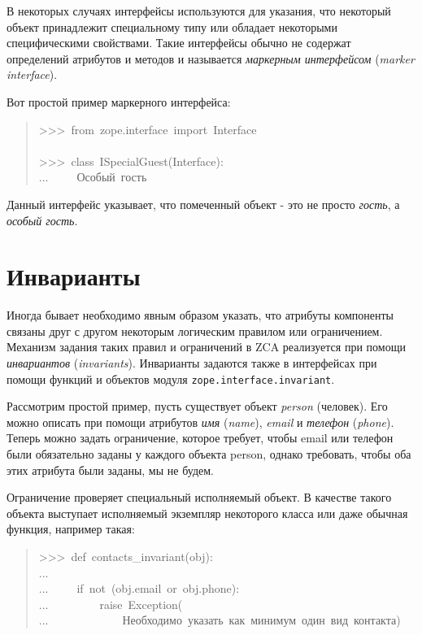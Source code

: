 \documentclass[a4paper,openany,twoside,final]{book}
\providecommand*{\DUroletitlereference}[1]{\textsl{#1}}
\begin{document}
В некоторых случаях интерфейсы используются для указания, что
некоторый объект принадлежит специальному типу или обладает некоторыми
специфическими свойствами.  Такие интерфейсы обычно не содержат
определений атрибутов и методов и называется \DUroletitlereference{маркерным интерфейсом}
(\DUroletitlereference{marker interface}).

Вот простой пример маркерного интерфейса:

\begin{quote}{\ttfamily \raggedright \noindent
>{}>{}>~from~zope.interface~import~Interface\\
~\\
>{}>{}>~class~ISpecialGuest(Interface):\\
...~~~~~\textquotedbl{}\textquotedbl{}\textquotedbl{}Особый~гость\textquotedbl{}\textquotedbl{}\textquotedbl{}
}
\end{quote}

Данный интерфейс указывает, что помеченный объект - это не просто
\DUroletitlereference{гость}, а \DUroletitlereference{особый гость}.


\section{Инварианты%
  \label{id32}%
}

Иногда бывает необходимо явным образом указать, что атрибуты
компоненты связаны друг с другом некоторым логическим правилом или
ограничением.  Механизм задания таких правил и ограничений в ZCA
реализуется при помощи \DUroletitlereference{инвариантов} (\DUroletitlereference{invariants}).  Инварианты
задаются также в интерфейсах при помощи функций и объектов модуля \texttt{zope.interface.invariant}.

Рассмотрим простой пример, пусть существует объект \DUroletitlereference{person} (человек).
Его можно описать при помощи атрибутов \DUroletitlereference{имя} (\DUroletitlereference{name}), \DUroletitlereference{email} и
\DUroletitlereference{телефон} (\DUroletitlereference{phone}).  Теперь можно задать ограничение, которое
требует, чтобы email или телефон были обязательно заданы у каждого
объекта person, однако требовать, чтобы оба этих атрибута были заданы,
мы не будем.

Ограничение проверяет специальный исполняемый объект.  В качестве
такого объекта выступает исполняемый экземпляр некоторого класса или
даже обычная функция, например такая:

\begin{quote}{\ttfamily \raggedright \noindent
>{}>{}>~def~contacts\_invariant(obj):\\
...\\
...~~~~~if~not~(obj.email~or~obj.phone):\\
...~~~~~~~~~raise~Exception(\\
...~~~~~~~~~~~~~\textquotedbl{}Необходимо~указать~как~минимум~один~вид~контакта\textquotedbl{})
}
\end{quote}
\end{document}
